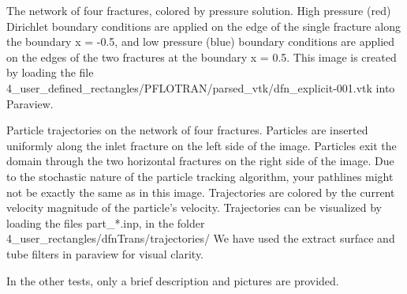 \documentclass[letterpaper,10pt,english]{sphinxmanual}
\begin{document}
The network of four fractures,  colored by pressure solution.
High pressure (red) Dirichlet boundary conditions are applied on the edge of the single fracture along the boundary x = -0.5, and low pressure (blue) boundary conditions are applied on the edges of the two fractures at the boundary x = 0.5.
This image is created by loading the file 4\_user\_defined\_rectangles/PFLOTRAN/parsed\_vtk/dfn\_explicit-001.vtk into Paraview.

{\hfill{}\hfill}

Particle trajectories on the network of four fractures.
Particles are inserted uniformly along the inlet fracture on the left side of the image.
Particles exit the domain through the two horizontal fractures on the right side of the image.
Due to the stochastic nature of the particle tracking algorithm, your pathlines might not be exactly the same as in this image.
Trajectories are colored by the current velocity magnitude of the particle's velocity.
Trajectories can be visualized by loading the files part\_*.inp, in the folder 4\_user\_rectangles/dfnTrans/trajectories/
We have used the extract surface and tube filters in paraview for visual clarity.

{\hfill{}\hfill}

In the other tests, only a brief description and pictures are provided.
\end{document}
